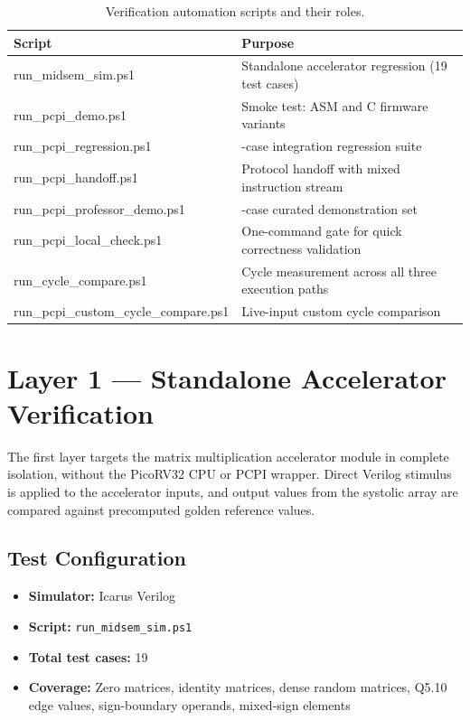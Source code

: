 ﻿\documentclass[12pt,a4paper]{report}
\renewcommand{\arraystretch}{1.2}
\begin{document}
\begin{table}[H]
\centering
\caption{Verification automation scripts and their roles.}
\label{tab:scripts}
\small
\setlength{\tabcolsep}{6pt}
\renewcommand{\arraystretch}{1.3}
\begin{tabularx}{\textwidth}{
  >{\ttfamily\raggedright\arraybackslash}p{}
  >{\raggedright\arraybackslash}X
}
\toprule
\textbf{Script} & \textbf{Purpose} \\
\midrule
run\_midsem\_sim.ps1            & Standalone accelerator regression (19 test cases) \\
run\_pcpi\_demo.ps1             & Smoke test: ASM and C firmware variants \\
run\_pcpi\_regression.ps1       & 8-case integration regression suite \\
run\_pcpi\_handoff.ps1          & Protocol handoff with mixed instruction stream \\
run\_pcpi\_professor\_demo.ps1  & 5-case curated demonstration set \\
run\_pcpi\_local\_check.ps1     & One-command gate for quick correctness validation \\
run\_cycle\_compare.ps1         & Cycle measurement across all three execution paths \\
run\_pcpi\_custom\_cycle\_compare.ps1 & Live-input custom cycle comparison \\
\bottomrule
\end{tabularx}
\end{table}

\section{Layer 1 --- Standalone Accelerator Verification}

The first layer targets the matrix multiplication accelerator module in complete isolation, without the PicoRV32 CPU or PCPI wrapper.
Direct Verilog stimulus is applied to the accelerator inputs, and output values from the systolic array are compared against precomputed golden reference values.

\subsection{Test Configuration}

\begin{itemize}
    \item \textbf{Simulator:} Icarus Verilog
    \item \textbf{Script:} \texttt{run\_midsem\_sim.ps1}
    \item \textbf{Total test cases:} 19
    \item \textbf{Coverage:} Zero matrices, identity matrices, dense random matrices, Q5.10 edge values, sign-boundary operands, mixed-sign elements
\end{itemize}
\end{document}
